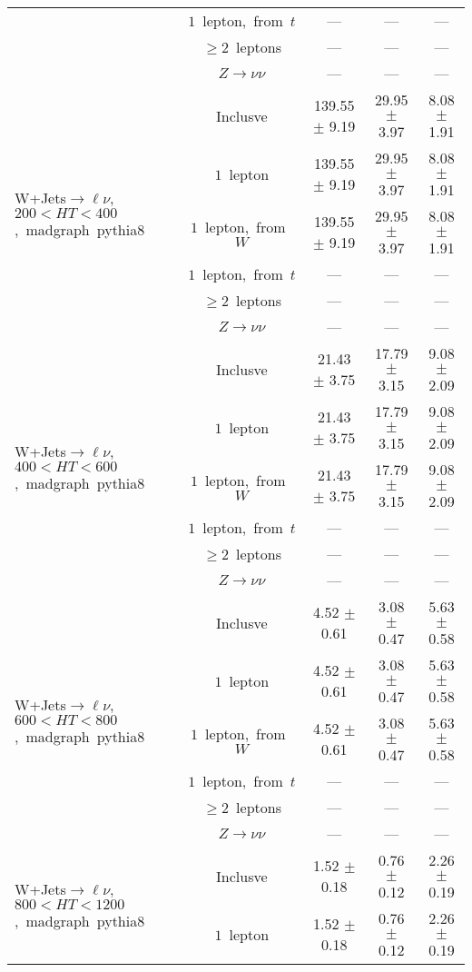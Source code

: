 \documentclass{article}
\begin{document}
\begin{longtable}{|l|c|c|c|c|}
 & $1$~lepton,~from~$t$  & ---  & ---  & --- \\* 
 & $\ge2$~leptons  & ---  & ---  & --- \\* 
 & $Z\rightarrow\nu\nu$  & ---  & ---  & --- \\* 
\hline 
\multirow{6}{*}{W+Jets$\rightarrow\ell\nu$,~$200<HT<400$,~madgraph~pythia8} & Inclusve  & 139.55 $\pm$ 9.19  & 29.95 $\pm$ 3.97  & 8.08 $\pm$ 1.91 \\* 
 & $1$~lepton  & 139.55 $\pm$ 9.19  & 29.95 $\pm$ 3.97  & 8.08 $\pm$ 1.91 \\* 
 & $1$~lepton,~from~$W$  & 139.55 $\pm$ 9.19  & 29.95 $\pm$ 3.97  & 8.08 $\pm$ 1.91 \\* 
 & $1$~lepton,~from~$t$  & ---  & ---  & --- \\* 
 & $\ge2$~leptons  & ---  & ---  & --- \\* 
 & $Z\rightarrow\nu\nu$  & ---  & ---  & --- \\* 
\hline 
\multirow{6}{*}{W+Jets$\rightarrow\ell\nu$,~$400<HT<600$,~madgraph~pythia8} & Inclusve  & 21.43 $\pm$ 3.75  & 17.79 $\pm$ 3.15  & 9.08 $\pm$ 2.09 \\* 
 & $1$~lepton  & 21.43 $\pm$ 3.75  & 17.79 $\pm$ 3.15  & 9.08 $\pm$ 2.09 \\* 
 & $1$~lepton,~from~$W$  & 21.43 $\pm$ 3.75  & 17.79 $\pm$ 3.15  & 9.08 $\pm$ 2.09 \\* 
 & $1$~lepton,~from~$t$  & ---  & ---  & --- \\* 
 & $\ge2$~leptons  & ---  & ---  & --- \\* 
 & $Z\rightarrow\nu\nu$  & ---  & ---  & --- \\* 
\hline 
\multirow{6}{*}{W+Jets$\rightarrow\ell\nu$,~$600<HT<800$,~madgraph~pythia8} & Inclusve  & 4.52 $\pm$ 0.61  & 3.08 $\pm$ 0.47  & 5.63 $\pm$ 0.58 \\* 
 & $1$~lepton  & 4.52 $\pm$ 0.61  & 3.08 $\pm$ 0.47  & 5.63 $\pm$ 0.58 \\* 
 & $1$~lepton,~from~$W$  & 4.52 $\pm$ 0.61  & 3.08 $\pm$ 0.47  & 5.63 $\pm$ 0.58 \\* 
 & $1$~lepton,~from~$t$  & ---  & ---  & --- \\* 
 & $\ge2$~leptons  & ---  & ---  & --- \\* 
 & $Z\rightarrow\nu\nu$  & ---  & ---  & --- \\* 
\hline 
\multirow{6}{*}{W+Jets$\rightarrow\ell\nu$,~$800<HT<1200$,~madgraph~pythia8} & Inclusve  & 1.52 $\pm$ 0.18  & 0.76 $\pm$ 0.12  & 2.26 $\pm$ 0.19 \\* 
 & $1$~lepton  & 1.52 $\pm$ 0.18  & 0.76 $\pm$ 0.12  & 2.26 $\pm$ 0.19 \\* 

\end{longtable}
\end{document}
